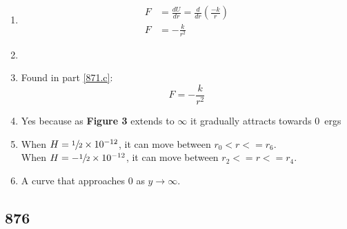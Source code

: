 \documentclass{article}
\begin{document}
\begin{enumerate}[label = \textbf{(\alph*)}]
\begin{itemize}
		\end{itemize}
	\item \label{871.c}
		\begin{align*}
			F & = \frac{dU}{dr} = \frac{d}{dr} \left( \frac{-k}{r} \right) \\
			F & = -\frac{k}{r^2}
		\end{align*}
	\item
	\item Found in part \ref{871.c}: $$ F = -\frac{k}{r^2} $$
	\item Yes because as \textbf{Figure 3} extends to $ \infty $ it gradually attracts towards \SI{0}{ergs}
	\item
		When $ H = \sfrac{1}{2} \times 10^{-12} $, it can move between $ r_0 < r <= r_6 $. \\
		When $ H = -\sfrac{1}{2} \times 10^{-12} $, it can move between $ r_2 <= r <= r_4 $.
	\item
		A curve that approaches $ 0 $ as $ y \rightarrow \infty $.
\end{enumerate}

\subsection{876}
\end{document}
